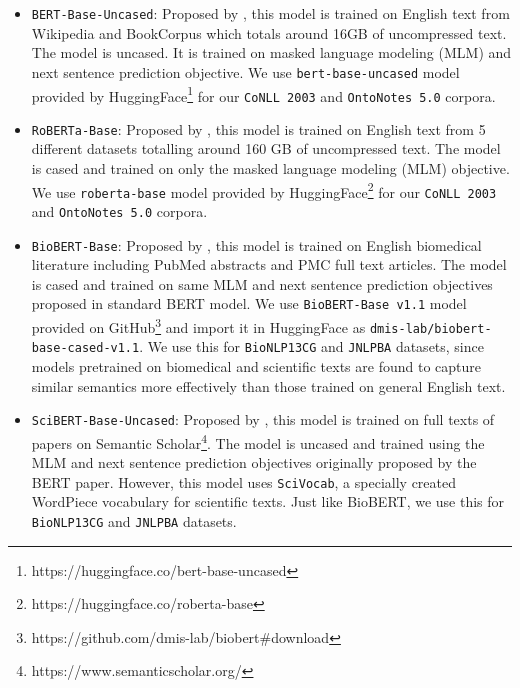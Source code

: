 \begin{itemize}
    \item \texttt{BERT-Base-Uncased}: Proposed by \cite{devlin2018bert}, this model is trained on English text from Wikipedia and BookCorpus\cite{moviebook} which totals around 16GB of uncompressed text. The model is uncased. It is trained on masked language modeling (MLM) and next sentence prediction objective. We use \texttt{bert-base-uncased} model provided by HuggingFace\footnote{https://huggingface.co/bert-base-uncased} for our \texttt{CoNLL 2003} and \texttt{OntoNotes 5.0} corpora.
    
    \item \texttt{RoBERTa-Base}: Proposed by \cite{liu2019roberta}, this model is trained on English text from 5 different datasets totalling around 160 GB of uncompressed text. The model is cased and trained on only the masked language modeling (MLM) objective. We use \texttt{roberta-base} model provided by HuggingFace\footnote{https://huggingface.co/roberta-base} for our \texttt{CoNLL 2003} and \texttt{OntoNotes 5.0} corpora.
    
    \item \texttt{BioBERT-Base}: Proposed by \cite{lee2020biobert}, this model is trained on English biomedical literature including PubMed abstracts and PMC full text articles. The model is cased and trained on same MLM and next sentence prediction objectives proposed in standard BERT model. We use \texttt{BioBERT-Base v1.1} model provided on GitHub\footnote{https://github.com/dmis-lab/biobert\#download} and import it in HuggingFace as \texttt{dmis-lab/biobert-base-cased-v1.1}. We use this for \texttt{BioNLP13CG} and \texttt{JNLPBA} datasets, since models pretrained on biomedical and scientific texts are found to capture similar semantics more effectively than those trained on general English text.
    
    \item \texttt{SciBERT-Base-Uncased}: Proposed by \cite{beltagy2019scibert}, this model is trained on full texts of papers on Semantic Scholar\footnote{https://www.semanticscholar.org/}. The model is uncased and trained using the MLM and next sentence prediction objectives originally proposed by the BERT paper. However, this model uses \texttt{SciVocab}, a specially created WordPiece vocabulary for scientific texts. Just like BioBERT, we use this for \texttt{BioNLP13CG} and \texttt{JNLPBA} datasets.
    
\end{itemize}

